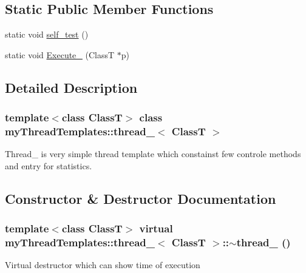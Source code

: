\subsection*{Static Public Member Functions}
\begin{DoxyCompactItemize}
\item 
static void \hyperlink{classmyThreadTemplates_1_1thread__1_add97f72749590d4023fd23fcd0a3dece}{self\_\-test} ()
\item 
static void \hyperlink{classmyThreadTemplates_1_1thread__1_a24e615ac4afa0d376faefd500ed47e43}{Execute\_\-} (ClassT $\ast$p)
\end{DoxyCompactItemize}


\subsection{Detailed Description}
\subsubsection*{template$<$class ClassT$>$ class myThreadTemplates::thread\_$<$ ClassT $>$}

Thread\_ is very simple thread template which constainst few controle methods and entry for statistics. 

\subsection{Constructor \& Destructor Documentation}
\hypertarget{classmyThreadTemplates_1_1thread__1_aab0cedc80707090ec300be40e68c19c1}{
\subsubsection[{$\sim$thread\_\-1}]{\setlength{\rightskip}{0pt plus 5cm}template$<$class ClassT$>$ virtual {\bf myThreadTemplates::thread\_}$<$ ClassT $>$::$\sim${\bf thread\_} ()}}
\label{classmyThreadTemplates_1_1thread__1_aab0cedc80707090ec300be40e68c19c1}


Virtual destructor which can show time of execution 



